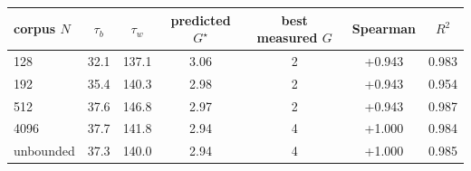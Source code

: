 \begin{tabular}{lcccccc}
\toprule
corpus $N$ & $\tau_b$ & $\tau_w$ & predicted $G^{\star}$ & best measured $G$ & Spearman & $R^2$ \\
\midrule
128 & 32.1 & 137.1 & 3.06 & 2 & +0.943 & 0.983 \\
192 & 35.4 & 140.3 & 2.98 & 2 & +0.943 & 0.954 \\
512 & 37.6 & 146.8 & 2.97 & 2 & +0.943 & 0.987 \\
4096 & 37.7 & 141.8 & 2.94 & 4 & +1.000 & 0.984 \\
unbounded & 37.3 & 140.0 & 2.94 & 4 & +1.000 & 0.985 \\
\bottomrule
\end{tabular}